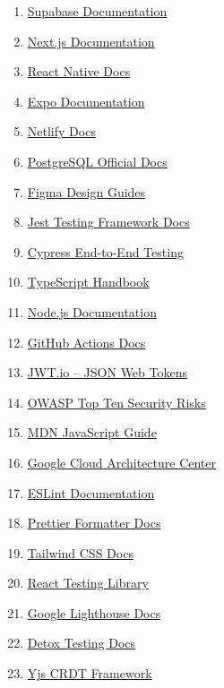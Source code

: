 \documentclass[12pt,a4paper]{report}
\begin{document}
\begin{enumerate}[label=\arabic*., leftmargin=*]
  \item \href{https://supabase.com/docs}{Supabase Documentation}\label{res:supabase}
  \item \href{https://nextjs.org/docs}{Next.js Documentation}\label{res:nextjs}
  \item \href{https://reactnative.dev/docs/getting-started}{React Native Docs}\label{res:reactnative}
  \item \href{https://docs.expo.dev}{Expo Documentation}\label{res:expo}
  \item \href{https://docs.netlify.com}{Netlify Docs}\label{res:netlify}
  \item \href{https://www.postgresql.org/docs/}{PostgreSQL Official Docs}\label{res:postgresql}
  \item \href{https://figma.com/resources/learn-design}{Figma Design Guides}\label{res:figma}
  \item \href{https://jestjs.io/docs}{Jest Testing Framework Docs}\label{res:jest}
  \item \href{https://docs.cypress.io}{Cypress End-to-End Testing}\label{res:cypress}
  \item \href{https://www.typescriptlang.org/docs}{TypeScript Handbook}\label{res:typescript}
  \item \href{https://nodejs.org/en/docs}{Node.js Documentation}\label{res:node}
  \item \href{https://docs.github.com/en/actions}{GitHub Actions Docs}\label{res:githubactions}
  \item \href{https://jwt.io/introduction}{JWT.io – JSON Web Tokens}\label{res:jwt}
  \item \href{https://owasp.org/www-project-top-ten/}{OWASP Top Ten Security Risks}\label{res:owasp}
  \item \href{https://developer.mozilla.org/en-US/docs/Web/JavaScript/Guide}{MDN JavaScript Guide}\label{res:mdn}
  \item \href{https://cloud.google.com/architecture}{Google Cloud Architecture Center}\label{res:gcp}
  \item \href{https://eslint.org/docs/latest}{ESLint Documentation}\label{res:eslint}
  \item \href{https://prettier.io/docs/en/index.html}{Prettier Formatter Docs}\label{res:prettier}
  \item \href{https://tailwindcss.com/docs}{Tailwind CSS Docs}\label{res:tailwind}
  \item \href{https://testing-library.com/docs/react-testing-library/intro}{React Testing Library}\label{res:reacttestinglibrary}
  \item \href{https://developer.chrome.com/docs/lighthouse/}{Google Lighthouse Docs}\label{res:lighthouse}
  \item \href{https://wix.github.io/Detox/docs/api}{Detox Testing Docs}\label{res:detox}
  \item \href{https://yjs.dev/}{Yjs CRDT Framework}\label{res:crdt}
\end{enumerate}
\end{document}
